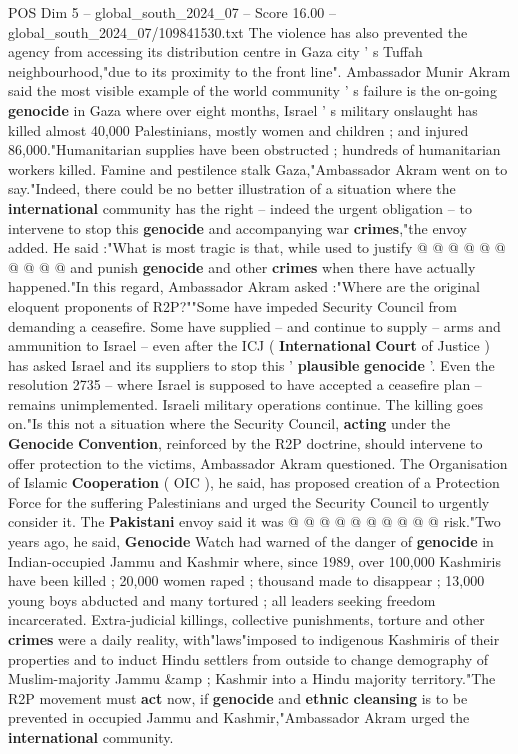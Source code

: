\begin{textsample}{POS Dim 5 – global\_south\_2024\_07 – Score 16.00 – global\_south\_2024\_07/109841530.txt}
The violence has also prevented the agency from accessing its distribution centre in Gaza city ' s Tuffah neighbourhood,"due to its proximity to the front line".
Ambassador Munir Akram said the most visible example of the world community ' s failure is the on-going \textbf{genocide} in Gaza where over eight months, Israel ' s military onslaught has killed almost 40,000 Palestinians, mostly women and children ; and injured 86,000."Humanitarian supplies have been obstructed ; hundreds of humanitarian workers killed.
Famine and pestilence stalk Gaza,"Ambassador Akram went on to say."Indeed, there could be no better illustration of a situation where the \textbf{international} community has the right -- indeed the urgent obligation -- to intervene to stop this \textbf{genocide} and accompanying war \textbf{crimes},"the envoy added.
He said :"What is most tragic is that, while used to justify @ @ @ @ @ @ @ @ @ @ and punish \textbf{genocide} and other \textbf{crimes} when there have actually happened."In this regard, Ambassador Akram asked :"Where are the original eloquent proponents of R2P?""Some have impeded Security Council from demanding a ceasefire.
Some have supplied -- and continue to supply -- arms and ammunition to Israel -- even after the ICJ ( \textbf{International} \textbf{Court} of Justice ) has asked Israel and its suppliers to stop this ' \textbf{plausible} \textbf{genocide} '.
Even the resolution 2735 -- where Israel is supposed to have accepted a ceasefire plan -- remains unimplemented.
Israeli military operations continue.
The killing goes on."Is this not a situation where the Security Council, \textbf{acting} under the \textbf{Genocide} \textbf{Convention}, reinforced by the R2P doctrine, should intervene to offer protection to the victims, Ambassador Akram questioned.
The Organisation of Islamic \textbf{Cooperation} ( OIC ), he said, has proposed creation of a Protection Force for the suffering Palestinians and urged the Security Council to urgently consider it.
The \textbf{Pakistani} envoy said it was @ @ @ @ @ @ @ @ @ @ risk."Two years ago, he said, \textbf{Genocide} Watch had warned of the danger of \textbf{genocide} in Indian-occupied Jammu and Kashmir where, since 1989, over 100,000 Kashmiris have been killed ; 20,000 women raped ; thousand made to disappear ; 13,000 young boys abducted and many tortured ; all leaders seeking freedom incarcerated.
Extra-judicial killings, collective punishments, torture and other \textbf{crimes} were a daily reality, with"laws"imposed to indigenous Kashmiris of their properties and to induct Hindu settlers from outside to change demography of Muslim-majority Jammu \&amp ; Kashmir into a Hindu majority territory."The R2P movement must \textbf{act} now, if \textbf{genocide} and \textbf{ethnic} \textbf{cleansing} is to be prevented in occupied Jammu and Kashmir,"Ambassador Akram urged the \textbf{international} community.

\end{textsample}
